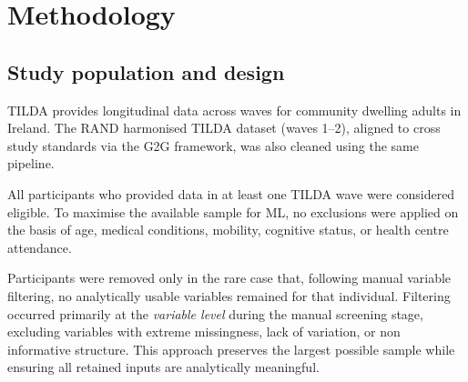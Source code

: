 
\chapter{Methodology}\label{ch:chapter3} %

\ifpdf
    \graphicspath{{3_chapter3/figures/PNG/}{3_chapter3/figures/PDF/}{3_chapter3/figures/}}
\else
    \graphicspath{{3_chapter3/figures/EPS/}{3_chapter3/figures/}}
\fi
\section{Study population and design}
\gls{TILDA} provides longitudinal data across waves for community dwelling adults in Ireland. The \gls{RAND} harmonised \gls{TILDA} dataset (waves 1--2), aligned to cross study standards via the \gls{G2G} framework, was also cleaned using the same pipeline.

All participants who provided data in at least one \gls{TILDA} wave were considered eligible. To maximise the available sample for \gls{ML}, no exclusions were applied on the basis of age, medical conditions, mobility, cognitive status, or health centre attendance.

Participants were removed only in the rare case that, following manual variable filtering, no analytically usable variables remained for that individual. Filtering occurred primarily at the \emph{variable level} during the manual screening stage, excluding variables with extreme missingness, lack of variation, or non informative structure. This approach preserves the largest possible sample while ensuring all retained inputs are analytically meaningful.

